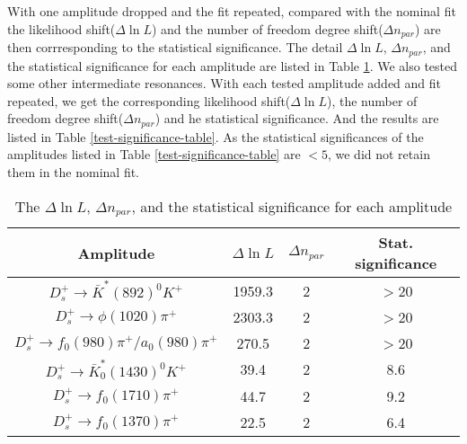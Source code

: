 {With one amplitude dropped and the fit repeated, compared with the nominal fit the likelihood shift($\Delta\ln L$) and the number of freedom degree shift($\Delta n_{par}$) are then corrresponding to the statistical significance.
The detail $\Delta\ln L$, $\Delta n_{par}$, and the statistical significance for each amplitude are  listed in Table \ref{significance-table}.
We also tested some other intermediate resonances. With each tested amplitude added and fit repeated, we get the corresponding likelihood shift($\Delta\ln L$), the number of freedom degree shift($\Delta n_{par}$) and he statistical significance.
And the results are listed in Table \ref{test-significance-table}.
As the statistical significances of the amplitudes listed in Table \ref{test-significance-table} are $<5$, we did not retain them in the nominal fit. 
\begin{table}
    \caption{The $\Delta\ln L$, $\Delta n_{par}$, and the statistical significance for each amplitude}
    \label{significance-table}
    \begin{center}
        \begin{tabular}{cccc}
            \toprule
            Amplitude & $\Delta\ln L$ & $\Delta n_{par}$ & Stat. significance\\
            \hline
            $D_{s}^{+} \rightarrow \bar{K}^{*}(892)^{0}K^{+}$              & 1959.3     & 2   & $>$20\\
            $D_{s}^{+} \rightarrow \phi(1020)\pi^{+}$                      & 2303.3     & 2   & $>$20\\
            $D_{s}^{+} \rightarrow f_{0}(980)\pi^{+}/a_{0}(980)\pi^{+}$    & 270.5      & 2   & $>$20\\
            $D_{s}^{+} \rightarrow \bar{K}^{*}_{0}(1430)^{0}K^{+}$         & 39.4       & 2   & 8.6\\
            $D_{s}^{+} \rightarrow f_{0}(1710)\pi^{+}$                     & 44.7       & 2   & 9.2\\
            $D_{s}^{+} \rightarrow f_{0}(1370)\pi^{+}$                     & 22.5       & 2   & 6.4\\
            \bottomrule
        \end{tabular}
    \end{center}
\end{table}

}
